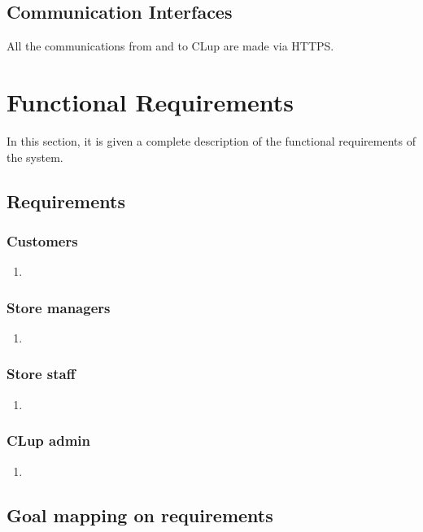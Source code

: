 \subsection{Communication Interfaces}
All the communications from and to CLup are made via HTTPS.

\section{Functional Requirements}
In this section, it is given a complete description of the functional requirements of the system.

    \subsection{Requirements}
    \subsubsection{Customers}
        \begin{enumerate}[label=\textbf{R.\arabic*}]
            \item
        \end{enumerate}

    \subsubsection{Store managers}
    \begin{enumerate}[label=\textbf{R.\arabic*}]
        \item
    \end{enumerate}

    \subsubsection{Store staff}
    \begin{enumerate}[label=\textbf{R.\arabic*}]
        \item
    \end{enumerate}

    \subsubsection{CLup admin}
    \begin{enumerate}[label=\textbf{R.\arabic*}]
        \item
    \end{enumerate}

    \subsection{Goal mapping on requirements}

